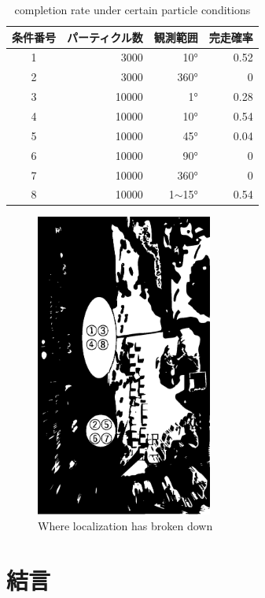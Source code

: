 \documentclass{jarticle}
\begin{document}
\begin{table}[htbp]
  \caption{completion rate under certain particle conditions}
  \label{table:完走率}
  \begin{tabular}{|c|r|r|r|} \hline
  条件番号 & パーティクル数 & 観測範囲  & 完走確率 \\ \hline \hline
  1 & 3000 & 10° & 0.52 \\ \hline
  2 & 3000 & 360° & 0 \\ \hline
  3 & 10000 & 1° & 0.28 \\ \hline
  4 & 10000 & 10° & 0.54 \\ \hline
  5 & 10000 & 45° & 0.04 \\ \hline
  6 & 10000 & 90° & 0 \\ \hline
  7 & 10000 & 360° & 0 \\ \hline
  8 & 10000 & 1$\sim$15° & 0.54 \\ \hline
  \end{tabular}
\end{table}

\begin{figure}[h]
  \centering
   \includegraphics[height=100mm]{fig/failure_location.eps}
   \vspace*{-4mm}
   \caption{Where localization has broken down}
   \label{fig: 失敗箇所}
\end{figure}


\section{結言}%


\footnotesize
\begin{thebibliography}{99}





\end{thebibliography}

\normalsize
\end{document}
